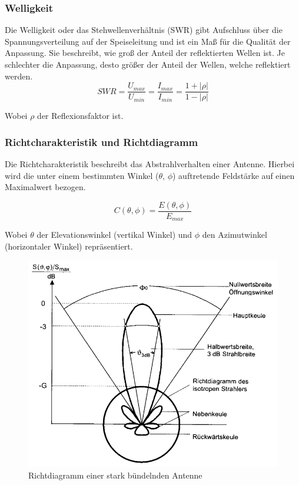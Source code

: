 \subsubsection{Welligkeit}
Die Welligkeit oder das Stehwellenverhältnis (SWR) gibt Aufschluss über die Spannungsverteilung auf der Speiseleitung und ist ein Maß für die Qualität der Anpassung. Sie beschreibt, wie groß der Anteil der reflektierten Wellen ist. Je schlechter die Anpassung, desto größer der Anteil der Wellen, welche reflektiert werden.\\


\begin{equation}
	SWR=\frac{U_{max}}{U_{min}}=\frac{I_{max}}{I_{min}}=\frac{1+\lvert \rho \lvert}{1-\lvert \rho \lvert}
\end{equation}

Wobei $\rho$ der Reflexionsfaktor ist. 

\subsubsection{Richtcharakteristik und Richtdiagramm}
Die Richtcharakteristik beschreibt das Abstrahlverhalten einer Antenne. Hierbei wird die unter einem bestimmten Winkel ($\theta$, $\phi$) auftretende Feldstärke auf einen Maximalwert bezogen.

\begin{equation}
	C(\theta, \phi)=\frac{E(\theta, \phi)}{E_{max}}
\end{equation}

Wobei $\theta$ der Elevationswinkel (vertikal Winkel) und $\phi$ den Azimutwinkel (horizontaler Winkel) repräsentiert.

\begin{figure}[h]
	\centering
	\includegraphics[width=16cm]{../ref/Richtdiagramm_Beispiel}
	\caption{Richtdiagramm einer stark bündelnden Antenne}
	\label{fig:Richtdiagramm Beispiel}
\end{figure}

